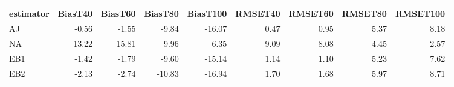 \begin{table}[ht]
\centering
\begin{tabular}{lrrrrrrrr}
  \toprule
estimator & BiasT40 & BiasT60 & BiasT80 & BiasT100 & RMSET40 & RMSET60 & RMSET80 & RMSET100 \\ 
  \midrule
AJ & -0.56 & -1.55 & -9.84 & -16.07 & 0.47 & 0.95 & 5.37 & 8.18 \\ 
  NA & 13.22 & 15.81 & 9.96 & 6.35 & 9.09 & 8.08 & 4.45 & 2.57 \\ 
  EB1 & -1.42 & -1.79 & -9.60 & -15.14 & 1.14 & 1.10 & 5.23 & 7.62 \\ 
  EB2 & -2.13 & -2.74 & -10.83 & -16.94 & 1.70 & 1.68 & 5.97 & 8.71 \\ 
   \bottomrule
\end{tabular}
\end{table}

